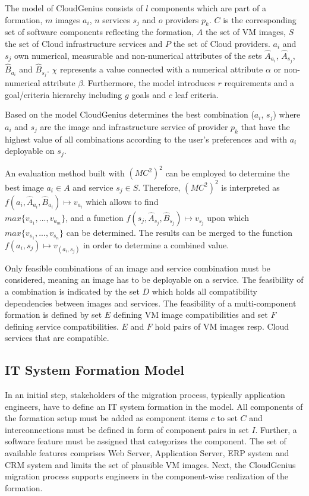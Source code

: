 \documentclass[10pt]{article}
\begin{document}
The model of CloudGenius consists of $l$ components which are part of a formation, $m$ images $a_i$, $n$ services $s_j$ and $o$ providers $p_k$. $C$ is the corresponding set of software components reflecting the formation, $A$ the set of VM images, $S$ the set of Cloud infrastructure services and $P$ the set of Cloud providers. $a_i$ and $s_j$ own numerical, measurable and non-numerical attributes of the sets $\hat{A}_{a_i}$, $\hat{A}_{s_j}$, $\hat{B}_{a_i}$ and $\hat{B}_{s_j}$. $\chi$ represents a value connected with a numerical attribute $\alpha$ or non-numerical attribute $\beta$. Furthermore, the model introduces $r$ requirements and a goal/criteria hierarchy including $g$ goals and $c$ leaf criteria. 


Based on the model CloudGenius determines the best combination ($a_i$, $s_j$) where $a_i$ and $s_j$ are the image and infrastructure service of provider $p_k$ that have the highest value of all combinations according to the user's preferences and with $a_i$ deployable on $s_j$. 

An evaluation method built with $(MC^2)^2$ can be employed to determine the best image $a_i \in A$ and service $s_j \in S$. Therefore, $(MC^2)^2$ is interpreted as $f(a_i, \hat{A}_{a_i}, \hat{B}_{a_i})\mapsto{}v_{a_i}$ which allows to find\\ $max \{v_{a_1}, ..., v_{a_m}\}$, and a function $f(s_j, \hat{A}_{s_j}, \hat{B}_{s_j})\mapsto{}v_{s_j}$ upon which $max \{v_{s_1}, ..., v_{s_n}\}$ can be determined. The results can be merged to the function $f(a_i,s_j)\mapsto{}v_{(a_i, s_j)}$ in order to determine a combined value.

Only feasible combinations of an image and service combination must be considered, meaning an image has to be deployable on a service. The feasibility of a combination is indicated by the set $D$ which holds all compatibility dependencies between images and services. The feasibility of a multi-component formation is defined by set $E$ defining VM image compatibilities and set $F$ defining service compatibilities. $E$ and $F$ hold pairs of VM images resp. Cloud services that are compatible.

\subsection{IT System Formation Model}

In an initial step, stakeholders of the migration process, typically application engineers, have to define an IT system formation in the model. All components of the formation setup must be added as component items $c$ to set $C$ and interconnections must be defined in form of component pairs  in set $I$. Further, a software feature must be assigned that categorizes the component. The set of available features comprises Web Server, Application Server, ERP system and CRM system and limits the set of plausible VM images. Next, the CloudGenius migration process supports engineers in the component-wise realization of the formation.
\end{document}

